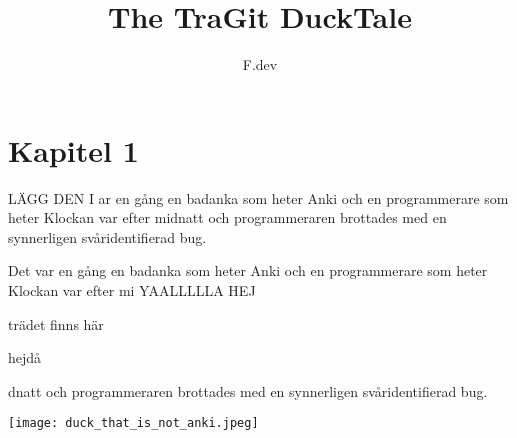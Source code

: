 \documentclass[a4paper]{article}
\begin{document}
\title{The TraGit DuckTale}
\author{F.dev}
\maketitle

\section*{Kapitel 1}

LÄGG DEN I ar en gång en badanka som heter Anki och en programmerare som heter %
Klockan var efter midnatt och programmeraren brottades med en synnerligen svåridentifierad bug.

Det var en gång en badanka som heter Anki och en programmerare som heter %
Klockan var efter mi
YAALLLLLA
HEJ


trädet finns här


hejdå


dnatt och programmeraren brottades med en synnerligen svåridentifierad bug.


\begin{center}
	\texttt{[image: duck\_that\_is\_not\_anki.jpeg]}
\end{center}


\end{document}
